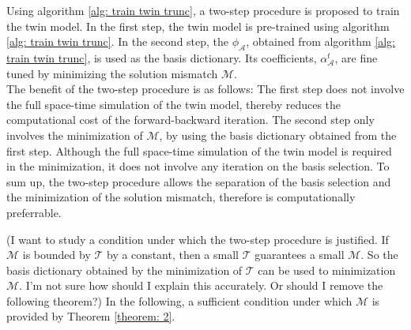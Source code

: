 Using algorithm \ref{alg: train twin trunc}, a two-step
procedure is proposed to train the twin model. In the first step, the twin model
is pre-trained using algorithm \ref{alg: train twin trunc}.
In the second step, the $\phi_{\mathcal{A}}$, obtained from algorithm 
\ref{alg: train twin trunc}, is used as the basis dictionary.
Its coefficients, $\alpha_\mathcal{A}^t$, are fine tuned by minimizing the 
solution mismatch $\mathcal{M}$.\\

The benefit of the two-step procedure is as follows:
The first step does not involve the full space-time simulation of the twin model, thereby 
reduces the computational cost of the forward-backward iteration. The second step only involves 
the minimization of $\mathcal{M}$, by using the basis dictionary obtained from the first step.
Although the full space-time simulation of the twin model is required in the minimization,
it does not involve any iteration on the basis selection. To sum up, the two-step procedure
allows the separation of the basis selection and the minimization of the solution mismatch,
therefore is computationally preferrable.

(I want to study a condition under which the two-step procedure is justified. 
If $\mathcal{M}$ is bounded by $\mathcal{T}$ by
a constant, then a small $\mathcal{T}$ guarantees a small $\mathcal{M}$. So the basis dictionary
obtained by the minimization of $\mathcal{T}$ can be used to minimization $\mathcal{M}$.
I'm not sure how should I explain this accurately. Or should I remove the following theorem?)
In the following, a sufficient condition under which $\mathcal{M}$ is provided
by Theorem \ref{theorem: 2}.\\

